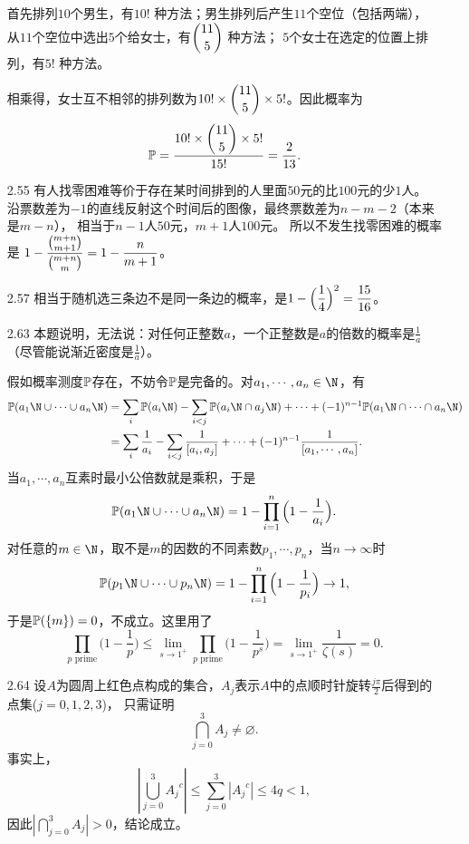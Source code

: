 \begin{itemize}
    首先排列$10$个男生，有$10!$ 种方法；男生排列后产生$11$个空位（包括两端），
    从$11$个空位中选出$5$个给女士，有$\dbinom{11}{5}$ 种方法；
    $5$个女士在选定的位置上排列，有$5!$ 种方法。

    相乘得，女士互不相邻的排列数为$10! \times \dbinom{11}{5} \times 5!$。因此概率为
    \[\mathbb{P} = \frac{10! \times \dbinom{11}{5} \times 5!}{15!} = \frac{2}{13}.\]

    \item[2.55]
    有人找零困难等价于存在某时间排到的人里面$50$元的比$100$元的少$1$人。
    沿票数差为$-1$的直线反射这个时间后的图像，最终票数差为$n-m-2$（本来是$m-n$），
    相当于$n-1$人$50$元，$m+1$人$100$元。
    所以不发生找零困难的概率是
    $\displaystyle 1-\frac{\binom{m+n}{m+1}}{\binom{m+n}{m}}=1-\frac{n}{m+1}$。

    \item[2.57]
    相当于随机选三条边不是同一条边的概率，是$\displaystyle 1-\Big(\frac{1}{4}\Big)^2=\frac{15}{16}$。

    \item[2.63]
    本题说明，无法说：对任何正整数$a$，一个正整数是$a$的倍数的概率是$\frac{1}{a}$
    （尽管能说渐近密度是$\frac{1}{a}$）。

    假如概率测度$\mathbb{P}$存在，不妨令$\mathbb{P}$是完备的。对$a_1,\cdots,a_n\in\N$，有
    \begin{align*}
        \p(a_1\N\cup\cdots\cup a_n\N)
        &=\sum_i\p(a_i\N)-\sum_{i<j}\p(a_i\N\cap a_j\N)
        +\cdots+(-1)^{n-1}\p(a_1\N\cap\cdots\cap a_n\N)\\
        &=\sum_i\frac{1}{a_i}-\sum_{i<j}\frac{1}{[a_i,a_j]}
        +\cdots+(-1)^{n-1}\frac{1}{[a_1,\cdots,a_n]}.
    \end{align*}
    当$a_1,\cdots,a_n$互素时最小公倍数就是乘积，于是
    $$\p(a_1\N\cup\cdots\cup a_n\N)=1-\prod_{i=1}^n\Big(1-\frac{1}{a_i}\Big).$$
    对任意的$m\in\N$，取不是$m$的因数的不同素数$p_1,\cdots,p_n$，当$n\to\infty$时
    $$\p(p_1\N\cup\cdots\cup p_n\N)
    =1-\prod_{i=1}^n\Big(1-\frac{1}{p_i}\Big)\to1,$$
    于是$\mathbb{P}(\{m\})=0$，不成立。这里用了
    $$\prod_{p\text{ prime}}\Big(1-\frac{1}{p}\Big)
    \le\lim_{s\to1^+}\prod_{p\text{ prime}}\Big(1-\frac{1}{p^s}\Big)
    =\lim_{s\to1^+}\frac{1}{\zeta(s)}=0.$$
    
    \item[2.64]
    设$A$为圆周上红色点构成的集合，$A_j$表示$A$中的点顺时针旋转$\frac{j\pi}{2}$后得到的点集($j=0,1,2,3$)，
    只需证明
    $$\bigcap_{j=0}^{3}A_j\neq \varnothing.$$
    事实上，$$\left|\bigcup_{j=0}^{3}{A_j}^c\right| \le \sum_{j=0}^{3} \left|{A_j}^c\right|\le 4q < 1,$$
    因此$\left|\bigcap\limits_{j=0}^{3}A_j\right|> 0$，结论成立。
\end{itemize}


